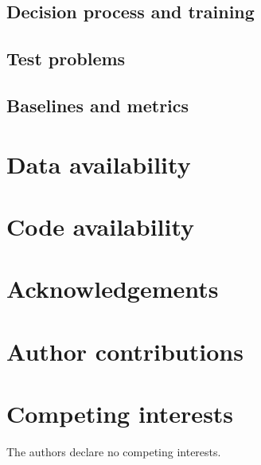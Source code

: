 \documentclass[11pt]{article}
\begin{document}
\subsection*{Decision process and training}
\label{sec:m-mdp}

\subsection*{Test problems}
\label{sec:m-pdes}

\subsection*{Baselines and metrics}
\label{sec:m-baselines}

\section*{Data availability}

\section*{Code availability}




\section*{Acknowledgements}

\section*{Author contributions}

\section*{Competing interests}
The authors declare no competing interests.
\end{document}
